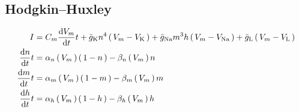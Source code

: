 \documentclass[../../Orator.tex]{subfiles}
\begin{document}
\subsection{Hodgkin–Huxley}
\begin{subequations}\label{eq:HodHuxSys}
    \begin{align}
        I &= C_m \ode{V_m}{t} + \bar{g}_\rmm{K} n^4 \br{V_m - V_\rmm{K}} + \bar{g}_\rmm{Na} m^3 h \br{V_m - V_\rmm{Na}}  + \bar{g}_\rmm{L} \br{V_m - V_\rmm{L}} \\ 
        \ode{n}{t} &= \alpha_n \br{V_m} \br{1-n} - \beta_n \br{V_m} n \\
        \ode{m}{t} &= \alpha_m \br{V_m} \br{1-m} - \beta_m \br{V_m} m \\
        \ode{h}{t} &= \alpha_h \br{V_m} \br{1-h} - \beta_h \br{V_m} h 
    \end{align}
\end{subequations}
\end{document}
